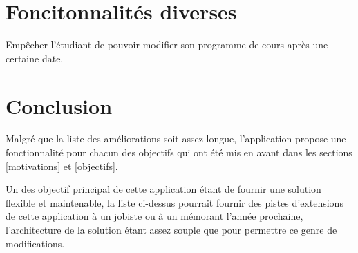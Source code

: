 \section{Foncitonnalités diverses}
Empêcher l'étudiant de pouvoir modifier son programme de cours après une certaine date. 
\section{Conclusion}
Malgré que la liste des améliorations soit assez longue, l'application propose une fonctionnalité pour chacun des objectifs qui ont été mis en avant dans les sections \ref{motivations} et \ref{objectifs}.

Un des objectif principal de cette application étant de fournir une solution flexible et maintenable, la liste ci-dessus pourrait fournir des pistes d'extensions de cette application à un jobiste ou à un mémorant l'année prochaine, l'architecture de la solution étant assez souple que pour permettre ce genre de modifications.  




